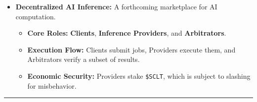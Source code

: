 \documentclass[10pt]{article}
\begin{document}
\begin{itemize}[leftmargin=*, itemsep=2pt]
\begin{figure}[H]
\caption{A visual comparison of different bonding curve models. Exponential curves offer aggressive price discovery, suitable for viral assets. Bancor-style curves provide more controlled and predictable price trajectories, with stability adjustable by the project creator via parameters like the Connector Weight.}
\label{fig:bonding_curves}
\end{figure}

    \item \textbf{Decentralized AI Inference:} A forthcoming marketplace for AI computation.
    \begin{itemize}[leftmargin=*, itemsep=2pt]
        \item \textbf{Core Roles:} \textbf{Clients}, \textbf{Inference Providers}, and \textbf{Arbitrators}.
        \item \textbf{Execution Flow:} Clients submit jobs, Providers execute them, and Arbitrators verify a subset of results.
        \item \textbf{Economic Security:} Providers stake \texttt{\$SCLT}, which is subject to slashing for misbehavior.
    \end{itemize}
\end{itemize}

\hrule
\newpage
\end{document}
